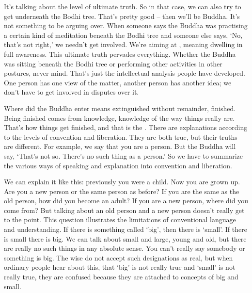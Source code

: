 It's talking about  the level of ultimate truth. So in that case, we can also try to get underneath the Bodhi tree. That's pretty good -- then we'll be Buddha. It's not something to be arguing over. When someone says the Buddha was practising a certain kind of meditation beneath the Bodhi tree and someone else says, `No, that's not right,' we needn't get involved. We're aiming at , meaning dwelling in full awareness. This ultimate truth pervades everything. Whether the Buddha was sitting beneath the Bodhi tree or performing other activities in other postures, never mind. That's just the intellectual analysis people have developed. One person has one view of the matter, another person has another idea; we don't have to get involved in disputes over it.

Where did the Buddha enter  means extinguished without remainder, finished. Being finished comes from knowledge, knowledge of the way things really are. That's how things get finished, and that is the . There are explanations according to the levels of convention and liberation. They are both true, but their truths are different. For example, we say that you are a person. But the Buddha will say, `That's not so. There's no such thing as a person.' So we have to summarize the various ways of speaking and explanation into convention and liberation.

We can explain it like this: previously you were a child. Now you are grown up. Are you a new person or the same person as before? If you are the same as the old person, how did you become an adult? If you are a new person, where did you come from? But talking about an old person and a new person doesn't really get to the point. This question illustrates the limitations of conventional language and understanding. If there is something called `big', then there is `small'. If there is small there is big. We can talk about small and large, young and old, but there are really no such things in any absolute sense. You can't really say somebody or something is big. The wise do not accept such designations as real, but when ordinary people hear about this, that `big' is not really true and `small' is not really true, they are confused because they are attached to concepts of big and small.

